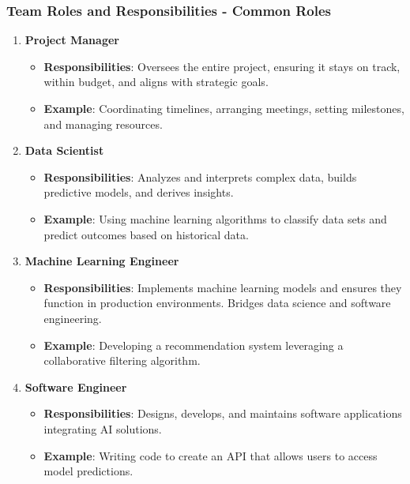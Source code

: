 \documentclass{beamer}
\begin{document}
\begin{frame}[fragile]
    \frametitle{Team Roles and Responsibilities - Common Roles}
    \begin{enumerate}
        \item \textbf{Project Manager}
            \begin{itemize}
                \item \textbf{Responsibilities}: Oversees the entire project, ensuring it stays on track, within budget, and aligns with strategic goals.
                \item \textbf{Example}: Coordinating timelines, arranging meetings, setting milestones, and managing resources.
            \end{itemize}
        
        \item \textbf{Data Scientist}
            \begin{itemize}
                \item \textbf{Responsibilities}: Analyzes and interprets complex data, builds predictive models, and derives insights.
                \item \textbf{Example}: Using machine learning algorithms to classify data sets and predict outcomes based on historical data.
            \end{itemize}

        \item \textbf{Machine Learning Engineer}
            \begin{itemize}
                \item \textbf{Responsibilities}: Implements machine learning models and ensures they function in production environments. Bridges data science and software engineering.
                \item \textbf{Example}: Developing a recommendation system leveraging a collaborative filtering algorithm.
            \end{itemize}

        \item \textbf{Software Engineer}
            \begin{itemize}
                \item \textbf{Responsibilities}: Designs, develops, and maintains software applications integrating AI solutions.
                \item \textbf{Example}: Writing code to create an API that allows users to access model predictions.
            \end{itemize}
    \end{enumerate}
\end{frame}
\end{document}
